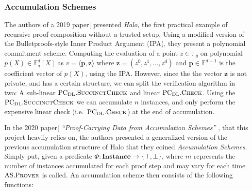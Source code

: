 \documentclass[
]{article}
\newcommand*\Fb{\mathbb{F}}
\renewcommand{\vec}[1]{ \boldsymbol{#1} }
\newcommand{\ip}[2]{ \langle #1, #2 \rangle }
\newcommand*{\Prover}{\mathrm{\text{P\scriptsize ROVER}}}
\newcommand*{\AS}{\text{AS}}
\newcommand*{\ASProver}{\AS.\Prover}
\newcommand*{\PCDL}{\text{PC}_{\text{DL}}}
\newcommand*{\PCDLSuccinctCheck}{\PCDL.\mathrm{\text{S{\scriptsize UCCINCT}C{\scriptsize HECK}}}}
\newcommand*{\PCDLCheck}{\PCDL.\mathrm{\text{C\scriptsize HECK}}}
\newcommand*\Instance{\mathbf{Instance}}
\begin{document}
\subsubsection{Accumulation Schemes}\label{accumulation-schemes}

The authors of a 2019 paper{[}\citeproc{ref-halo}{Bowe et al. 2019}{]}
presented \emph{Halo,} the first practical example of recursive proof
composition without a trusted setup. Using a modified version of the
Bulletproofs-style Inner Product Argument (IPA), they present a
polynomial commitment scheme. Computing the evaluation of a point \(z
\in \Fb_q\) on polynomial \(p(X) \in \Fb^d_q[X]\) as
\(v = \ip{\vec{p}}{\vec{z}}\) where
\(\vec{z} = (z^0, z^1, \dots, z^{d})\) and \(\vec{p} \in \Fb^{d+1}\) is
the coefficient vector of \(p(X)\), using the IPA. However, since the
the vector \(\vec{z}\) is not private, and has a certain structure, we
can split the verification algorithm in two: A sub-linear
\(\PCDLSuccinctCheck\) and linear \(\PCDLCheck\). Using the
\(\PCDLSuccinctCheck\) we can accumulate \(n\) instances, and only
perform the expensive linear check (i.e.~\(\PCDLCheck\)) at the end of
accumulation.

In the 2020 paper{[}\citeproc{ref-pcd}{Bünz et al. 2020}{]}
\emph{``Proof-Carrying Data from Accumulation Schemes''} , that this
project heavily relies on, the authors presented a generalized version
of the previous accumulation structure of Halo that they coined
\emph{Accumulation Schemes}. Simply put, given a predicate
\(\Phi: \Instance \to
\{ \top, \bot \}\), where \(m\) represents the number of instances
accumulated for each proof step and may vary for each time \(\ASProver\)
is called. An accumulation scheme then consists of the following
functions:
\end{document}
